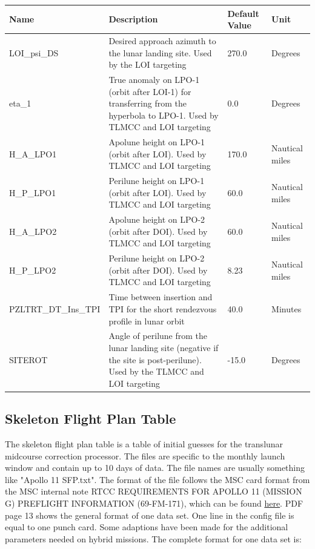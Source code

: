 \documentclass[11pt]{article} %
\begin{document}
\begin{tabular}{L{3.7cm} L{7cm} L{1.95cm} L{1.5cm}}
\hline
\textbf{Name} & \textbf{Description} & \textbf{Default Value} & \textbf{Unit}\\
\hline
LOI\_psi\_DS & Desired approach azimuth to the lunar landing site. Used by the LOI targeting & 270.0 & Degrees\\
\hline
eta\_1 & True anomaly on LPO-1 (orbit after LOI-1) for transferring from the hyperbola to LPO-1. Used by TLMCC and LOI targeting & 0.0 & Degrees\\
\hline
H\_A\_LPO1 &Apolune height on LPO-1 (orbit after LOI). Used by TLMCC and LOI targeting&170.0& Nautical miles\\
\hline
H\_P\_LPO1 &Perilune height on LPO-1 (orbit after LOI). Used by TLMCC and LOI targeting&60.0& Nautical miles\\
\hline
H\_A\_LPO2 &Apolune height on LPO-2 (orbit after DOI). Used by TLMCC and LOI targeting&60.0& Nautical miles\\
\hline
H\_P\_LPO2 &Perilune height on LPO-2 (orbit after DOI). Used by TLMCC and LOI targeting&8.23& Nautical miles\\
\hline
PZLTRT\_DT\_Ins\_TPI & Time between insertion and TPI for the short rendezvous profile in lunar orbit & 40.0 & Minutes\\
\hline
SITEROT & Angle of perilune from the lunar landing site (negative if the site is post-perilune). Used by the TLMCC and LOI targeting & -15.0 & Degrees\\
\end{tabular}

\newpage
\subsection{Skeleton Flight Plan Table}

The skeleton flight plan table is a table of initial guesses for the translunar midcourse correction processor. The files are specific to the monthly launch window and contain up to 10 days of data. The file names are usually something like "Apollo 11 SFP.txt". The format of the file follows the MSC card format from the MSC internal note RTCC REQUIREMENTS FOR APOLLO 11 (MISSION G) PREFLIGHT INFORMATION (69-FM-171), which can be found \href{https://web.archive.org/web/20100524010957/http://ntrs.nasa.gov/archive/nasa/casi.ntrs.nasa.gov/19740072570_1974072570.pdf}{here}. PDF page 13 shows the general format of one data set. One line in the config file is equal to one punch card. Some adaptions have been made for the additional parameters needed on hybrid missions. The complete format for one data set is:\\
\end{document}
